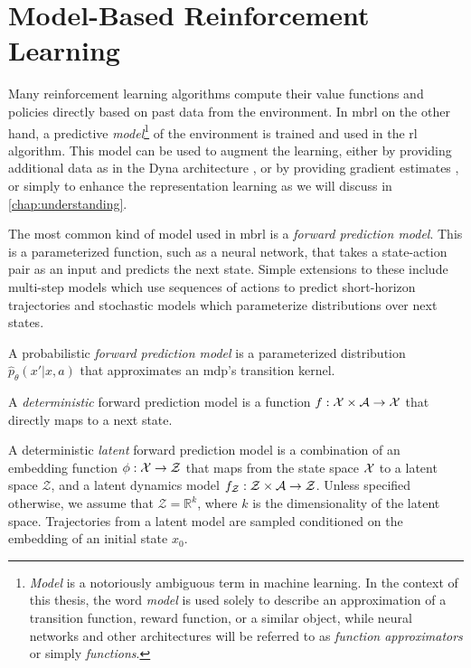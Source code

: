 \section{Model-Based Reinforcement Learning}
\label{sec:model_learning}

Many reinforcement learning algorithms compute their value functions and policies directly based on past data from the environment.
In \ac{mbrl} on the other hand, a predictive \emph{model}\footnote{\emph{Model} is a notoriously ambiguous term in machine learning. In the context of this thesis, the word \emph{model} is used solely to describe an approximation of a transition function, reward function, or a similar object, while neural networks and other architectures will be referred to as \emph{function approximators} or simply \emph{functions}.} of the environment is trained and used in the \ac{rl} algorithm.
This model can be used to augment the learning, either by providing additional data as in the Dyna architecture \parencite{dyna}, or by providing gradient estimates \parencite{hafner2020dream,amos2021model}, or simply to enhance the representation learning as we will discuss in \autoref{chap:understanding}.

The most common kind of model used in \ac{mbrl} is a \emph{forward prediction model}.
This is a parameterized function, such as a neural network, that takes a state-action pair as an input and predicts the next state.
Simple extensions to these include multi-step models which use sequences of actions to predict short-horizon trajectories and stochastic models which parameterize distributions over next states.

\begin{definition}
    A probabilistic \emph{forward prediction model} is a parameterized distribution $\hat{p}_\theta(x'|x,a)$ that approximates an \ac{mdp}'s transition kernel.
    
    A \emph{deterministic} forward prediction model is a function $f: \mathcal{X} \times \mathcal{A} \rightarrow \mathcal{X}$ that directly maps to a next state.

    A deterministic \emph{latent} forward prediction model is a combination of an embedding function $\phi: \mathcal{X} \rightarrow \mathcal{Z}$ that maps from the state space $\mathcal{X}$ to a latent space $\mathcal{Z}$, and a latent dynamics model $f_\mathcal{Z}: \mathcal{Z} \times \mathcal{A} \rightarrow \mathcal{Z}$.
    Unless specified otherwise, we assume that $\mathcal{Z} = \mathbb{R}^k$, where $k$ is the dimensionality of the latent space.
    Trajectories from a latent model are sampled conditioned on the embedding of an initial state $x_0$.
\end{definition}

